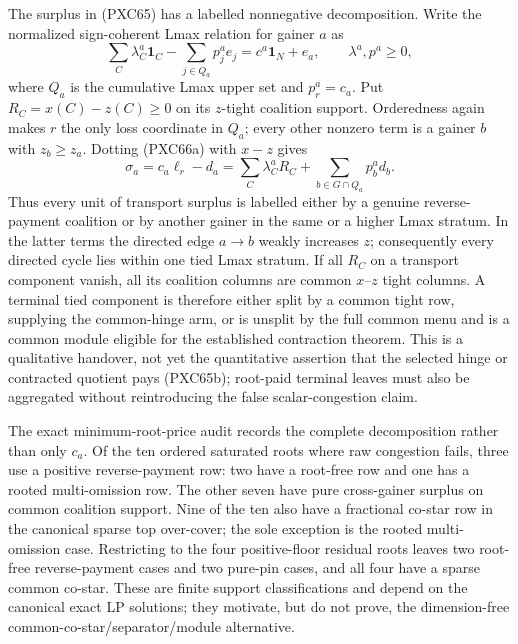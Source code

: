 \documentclass[11pt]{article}
\begin{document}
The surplus in (PXC65) has a labelled nonnegative decomposition.  Write the
normalized sign-coherent Lmax relation for gainer $a$ as
\[
 \sum_C\lambda^a_C\mathbf1_C-
 \sum_{j\in Q_a}p^a_je_j=c^a\mathbf1_N+e_a,
 \qquad \lambda^a,p^a\ge0,                          \tag{PXC66a}
\]
where $Q_a$ is the cumulative Lmax upper set and $p^a_r=c_a$.  Put
$R_C=x(C)-z(C)\ge0$ on its $z$-tight coalition support.  Orderedness again
makes $r$ the only loss coordinate in $Q_a$; every other nonzero term is a
gainer $b$ with $z_b\ge z_a$.  Dotting (PXC66a) with $x-z$ gives
\[
 \boxed{\qquad
 \sigma_a=c_a\ell_r-d_a
 =\sum_C\lambda^a_CR_C+
   \sum_{b\in G\cap Q_a}p^a_bd_b.
 \qquad}                                             \tag{PXC66}
\]
Thus every unit of transport surplus is labelled either by a genuine
reverse-payment coalition or by another gainer in the same or a higher Lmax
stratum.  In the latter terms the directed edge $a\to b$ weakly increases
$z$; consequently every directed cycle lies within one tied Lmax stratum.
If all $R_C$ on a transport component vanish, all its coalition columns are
common $x$--$z$ tight columns.  A terminal tied component is therefore
either split by a common tight row, supplying the common-hinge arm, or is
unsplit by the full common menu and is a common module eligible for the
established contraction theorem.  This is a qualitative handover, not yet
the quantitative assertion that the selected hinge or contracted quotient
pays (PXC65b); root-paid terminal leaves must also be aggregated without
reintroducing the false scalar-congestion claim.

The exact minimum-root-price audit records the complete decomposition rather
than only $c_a$.  Of the ten ordered saturated roots where raw congestion
fails, three use a positive reverse-payment row: two have a root-free row
and one has a rooted multi-omission row.  The other seven have pure
cross-gainer surplus on common coalition support.  Nine of the ten also
have a fractional co-star row in the canonical sparse top over-cover; the
sole exception is the rooted multi-omission case.  Restricting to the four
positive-floor residual roots leaves two root-free reverse-payment cases and
two pure-pin cases, and all four have a sparse common co-star.  These are
finite support classifications and depend on the canonical exact LP
solutions; they motivate, but do not prove, the dimension-free
common-co-star/separator/module alternative.
\end{document}
